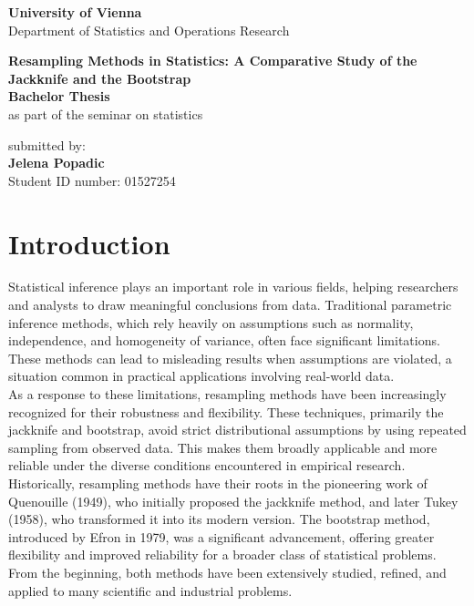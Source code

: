 \documentclass{article}
\begin{document}
\thispagestyle{empty}
\begin{center}
\large{\textbf{University of Vienna} \\ Department of Statistics and Operations Research \\}
\vspace{4cm}

\Huge{\textbf{Resampling Methods in Statistics: A Comparative Study of the
Jackknife and the Bootstrap}} \\
\vspace{4cm}
\Large{\textbf{Bachelor Thesis} \\
as part of the seminar on statistics }
\vspace{2cm}

\large{submitted by: \\
\textbf{Jelena Popadic} \\
Student ID number: 01527254}
\vspace{1cm}

\end{center}

\tableofcontents

\newpage

\section{Introduction}

Statistical inference plays an important role in various fields, helping researchers and analysts to draw meaningful conclusions from data. Traditional parametric inference methods, which rely heavily on assumptions such as normality, independence, and homogeneity of variance, often face significant limitations. These methods can lead to misleading results when assumptions are violated, a situation common in practical applications involving real-world data. \\

As a response to these limitations, resampling methods have been increasingly recognized for their robustness and flexibility. These techniques, primarily the jackknife and bootstrap, avoid strict distributional assumptions by using repeated sampling from observed data. This makes them broadly applicable and more reliable under the diverse conditions encountered in empirical research. \\

Historically, resampling methods have their roots in the pioneering work of Quenouille (1949), who initially proposed the jackknife method, and later Tukey (1958), who transformed it into its modern version. The bootstrap method, introduced by Efron in 1979, was a significant advancement, offering greater flexibility and improved reliability for a broader class of statistical problems. From the beginning, both methods have been extensively studied, refined, and applied to many scientific and industrial problems.\\
\end{document}
